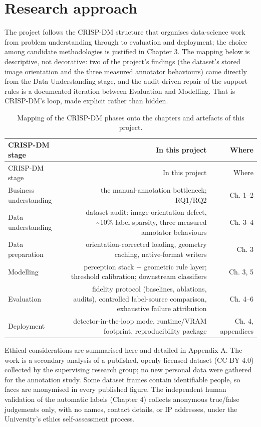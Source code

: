 \section{Research approach}

The project follows the CRISP-DM structure that organises data-science work from problem understanding through to evaluation and deployment; the choice among candidate methodologies is justified in Chapter 3. The mapping below is descriptive, not decorative: two of the project's findings (the dataset's stored image orientation and the three measured annotator behaviours) came directly from the Data Understanding stage, and the audit-driven repair of the support rules is a documented iteration between Evaluation and Modelling. That is CRISP-DM's loop, made explicit rather than hidden.

\begin{center}
\small
\begin{longtable}{lrr}
\caption{Mapping of the CRISP-DM phases onto the chapters and artefacts of this project.}\\
\hline
CRISP-DM stage & In this project & Where \\
\hline
\endfirsthead
\hline
CRISP-DM stage & In this project & Where \\
\hline
\endhead
Business understanding & the manual-annotation bottleneck; RQ1/RQ2 & Ch. 1--2 \\
Data understanding & dataset audit: image-orientation defect, \textasciitilde{}10\% label sparsity, three measured annotator behaviours & Ch. 3--4 \\
Data preparation & orientation-corrected loading, geometry caching, native-format writers & Ch. 3 \\
Modelling & perception stack + geometric rule layer; threshold calibration; downstream classifiers & Ch. 3, 5 \\
Evaluation & fidelity protocol (baselines, ablations, audits), controlled label-source comparison, exhaustive failure attribution & Ch. 4--6 \\
Deployment & detector-in-the-loop mode, runtime/VRAM footprint, reproducibility package & Ch. 4, appendices \\
\hline
\end{longtable}
\end{center}

Ethical considerations are summarised here and detailed in Appendix A. The work is a secondary analysis of a published, openly licensed dataset (CC-BY 4.0) collected by the supervising research group; no new personal data were gathered for the annotation study. Some dataset frames contain identifiable people, so faces are anonymised in every published figure. The independent human validation of the automatic labels (Chapter 4) collects anonymous true/false judgements only, with no names, contact details, or IP addresses, under the University's ethics self-assessment process.

